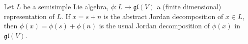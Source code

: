 Let $L$ be a semisimple Lie algebra, $\phi: L \rightarrow \mathfrak{gl}(V)$ a (finite dimensional) representation of $L$. If $x = s + n$ is the abstract Jordan decomposition of $x \in L$, then $\phi(x) = \phi(s) + \phi(n)$ is the usual Jordan decomposition of $\phi(x)$ in $\mathfrak{gl}(V)$.
